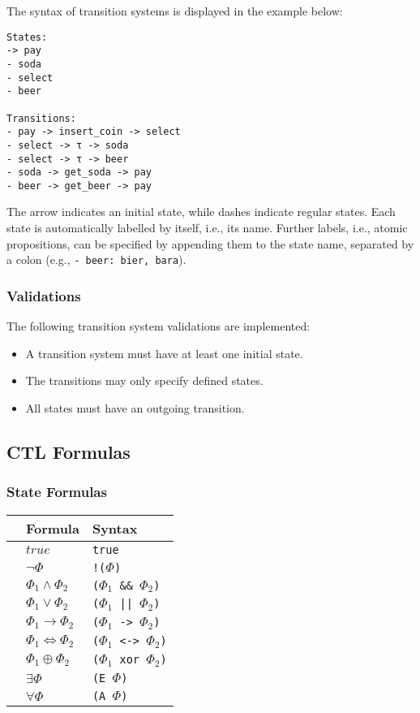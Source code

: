 \documentclass[11pt]{article}
\begin{document}
The syntax of transition systems is displayed in the example below:

\begin{lstlisting}
States:
-> pay
- soda
- select
- beer

Transitions:
- pay -> insert_coin -> select
- select -> τ -> soda
- select -> τ -> beer
- soda -> get_soda -> pay
- beer -> get_beer -> pay
\end{lstlisting}


The arrow indicates an initial state, while dashes indicate regular states.
Each state is automatically labelled by itself, i.e., its name.
Further labels, i.e., atomic propositions, can be specified by appending them to the state name, separated by a colon (e.g., \verb|- beer: bier, bara|).

\subsubsection{Validations}

The following transition system validations are implemented:

\begin{itemize}
  \item A transition system must have at least one initial state.
  \item The transitions may only specify defined states.
  \item All states must have an outgoing transition.
\end{itemize}

\subsection{CTL Formulas}

\subsubsection{State Formulas}

\begin{tabular}{l|ll}
  & Formula & Syntax \\
  \hline
  & $true$ & \verb|true| \\
  & $\neg\Phi$ & \verb|!(|$\Phi$\verb|)| \\
  & $\Phi_1 \wedge \Phi_2$ & \verb|(|$\Phi_1$\verb| && |$\Phi_2$\verb|)| \\
  & $\Phi_1 \vee \Phi_2$ & \verb|(|$\Phi_1$\verb[ || [$\Phi_2$\verb|)| \\
  & $\Phi_1 \rightarrow \Phi_2$ & \verb|(|$\Phi_1$\verb| -> |$\Phi_2$\verb|)| \\
  & $\Phi_1 \iff \Phi_2$ & \verb|(|$\Phi_1$\verb| <-> |$\Phi_2$\verb|)| \\
  & $\Phi_1 \oplus \Phi_2$ & \verb|(|$\Phi_1$\verb| xor |$\Phi_2$\verb|)| \\
  & $\exists \Phi$ & \verb|(E |$\Phi$\verb|)| \\
  & $\forall \Phi$ & \verb|(A |$\Phi$\verb|)| \\
\end{tabular}
\end{document}
